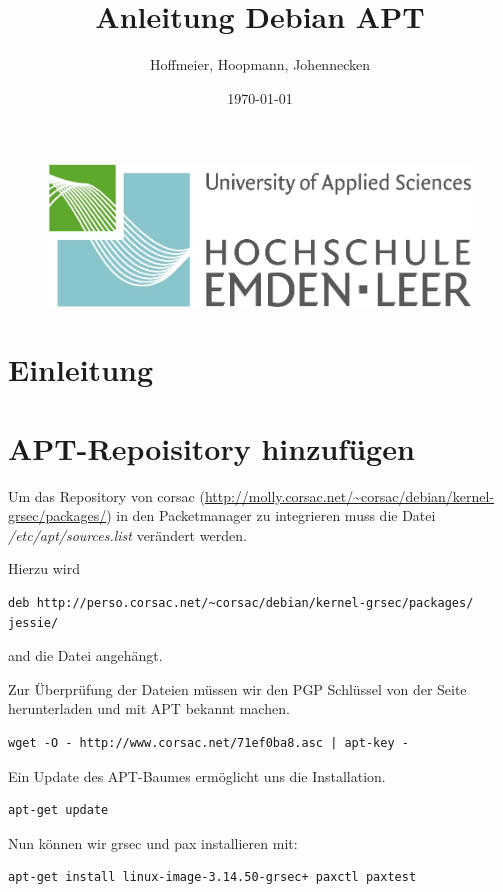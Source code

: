\documentclass[parskip=full-]{scrartcl}
\author{Hoffmeier, Hoopmann, Johennecken}
\title{Anleitung Debian APT}
\date {\today}
\begin{document}
\maketitle
\begin{figure}[H]
    \centering
    \includegraphics[scale=.5]{img/hs}
\end{figure}
\begin{abstract}
\end{abstract}
\tableofcontents
\newpage
\section{Einleitung}
\section{APT-Repoisitory hinzufügen}
Um das Repository von corsac (\url{http://molly.corsac.net/~corsac/debian/kernel-grsec/packages/}) in den Packetmanager zu integrieren muss die Datei \textit{/etc/apt/sources.list} verändert werden.

Hierzu wird 
\begin{lstlisting}
deb http://perso.corsac.net/~corsac/debian/kernel-grsec/packages/ jessie/
\end{lstlisting}
and die Datei angehängt.

Zur Überprüfung der Dateien müssen wir den PGP Schlüssel von der Seite herunterladen und mit APT bekannt machen.
\begin{lstlisting}
wget -O - http://www.corsac.net/71ef0ba8.asc | apt-key -
\end{lstlisting}

Ein Update des APT-Baumes ermöglicht uns die Installation.
\begin{lstlisting}
apt-get update
\end{lstlisting}

Nun können wir grsec und pax installieren mit:
\begin{lstlisting}
apt-get install linux-image-3.14.50-grsec+ paxctl paxtest
\end{lstlisting}
\end{document}
